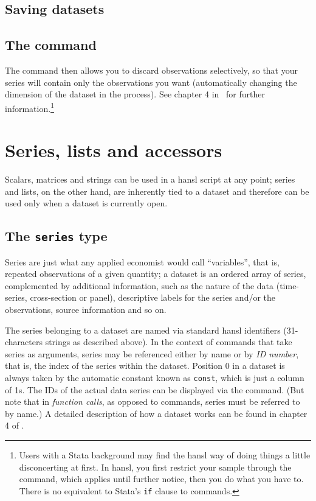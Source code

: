 \section{Saving datasets}

\section{The  command}

The  command then allows
you to discard observations selectively, so that your series will
contain only the observations you want (automatically changing the
dimension of the dataset in the process). See chapter 4 in \GUG\ for
further information.\footnote{Users with a Stata background may find
  the hansl way of doing things a little disconcerting at first. In
  hansl, you first restrict your sample through the 
  command, which applies until further notice, then you do what you
  have to. There is no equivalent to Stata's \texttt{if} clause to
  commands.}

\chapter{Series, lists and accessors}

Scalars, matrices and strings can be used in a hansl script at any
point; series and lists, on the other hand, are inherently tied to a
dataset and therefore can be used only when a dataset is currently
open.

\section{The \texttt{series} type}
\label{sec:series}
 
Series are just what any applied economist would call ``variables'',
that is, repeated observations of a given quantity; a dataset is an
ordered array of series, complemented by additional information,
such as the nature of the data (time-series, cross-section or panel),
descriptive labels for the series and/or the observations, source
information and so on.

The series belonging to a dataset are named via standard hansl
identifiers (31-characters strings as described above). In the context
of commands that take series as arguments, series may be referenced
either by name or by \emph{ID number}, that is, the index of the
series within the dataset. Position 0 in a dataset is always taken by
the automatic constant known as \texttt{const}, which is just a column
of 1s. The IDs of the actual data series can be displayed via the
 command. (But note that in \textit{function calls}, as
opposed to commands, series must be referred to by name.)  A detailed
description of how a dataset works can be found in chapter 4 of
\GUG.

